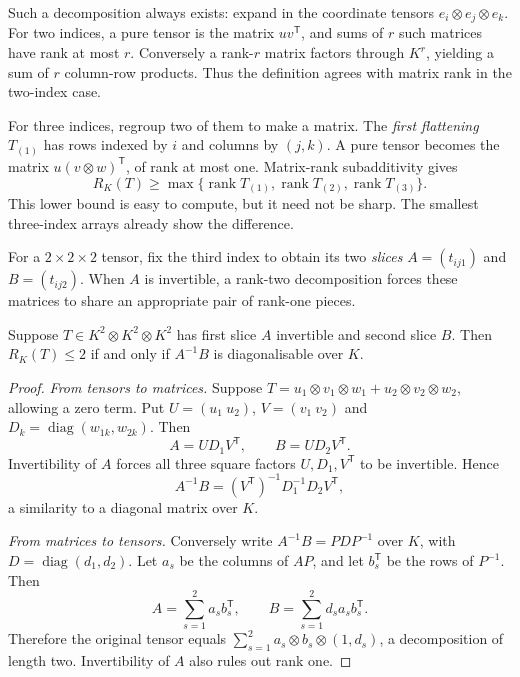 Such a decomposition always exists: expand in the coordinate tensors $e_i\otimes e_j\otimes e_k$. For two indices, a pure tensor is the matrix $uv^{\mathsf T}$, and sums of $r$ such matrices have rank at most $r$. Conversely a rank-$r$ matrix factors through $K^r$, yielding a sum of $r$ column-row products. Thus the definition agrees with matrix rank in the two-index case.

For three indices, regroup two of them to make a matrix. The \emph{first flattening} $T_{(1)}$ has rows indexed by $i$ and columns by $(j,k)$. A pure tensor becomes the matrix $u(v\otimes w)^{\mathsf T}$, of rank at most one. Matrix-rank subadditivity gives
\[
R_K(T)\ge\max\{\operatorname{rank}T_{(1)},\operatorname{rank}T_{(2)},\operatorname{rank}T_{(3)}\}.
\]
This lower bound is easy to compute, but it need not be sharp. The smallest three-index arrays already show the difference.

For a $2\times2\times2$ tensor, fix the third index to obtain its two \emph{slices} $A=(t_{ij1})$ and $B=(t_{ij2})$. When $A$ is invertible, a rank-two decomposition forces these matrices to share an appropriate pair of rank-one pieces.

\begin{lemma}\label{linear:lem:slices}
Suppose $T\in K^2\otimes K^2\otimes K^2$ has first slice $A$ invertible and second slice $B$. Then $R_K(T)\le2$ if and only if $A^{-1}B$ is diagonalisable over $K$.
\end{lemma}
\begin{proof}
\emph{From tensors to matrices.} Suppose $T=u_1\otimes v_1\otimes w_1+u_2\otimes v_2\otimes w_2$, allowing a zero term. Put $U=(u_1\ u_2)$, $V=(v_1\ v_2)$ and $D_k=\operatorname{diag}(w_{1k},w_{2k})$. Then
\[
A=UD_1V^{\mathsf T},\qquad B=UD_2V^{\mathsf T}.
\]
Invertibility of $A$ forces all three square factors $U,D_1,V^{\mathsf T}$ to be invertible. Hence
\[
A^{-1}B=(V^{\mathsf T})^{-1}D_1^{-1}D_2V^{\mathsf T},
\]
a similarity to a diagonal matrix over $K$.

\emph{From matrices to tensors.} Conversely write $A^{-1}B=PDP^{-1}$ over $K$, with $D=\operatorname{diag}(d_1,d_2)$. Let $a_s$ be the columns of $AP$, and let $b_s^{\mathsf T}$ be the rows of $P^{-1}$. Then
\[
A=\sum_{s=1}^2a_sb_s^{\mathsf T},\qquad
B=\sum_{s=1}^2d_sa_sb_s^{\mathsf T}.
\]
Therefore the original tensor equals $\sum_{s=1}^2a_s\otimes b_s\otimes(1,d_s)$, a decomposition of length two. Invertibility of $A$ also rules out rank one.
\end{proof}

